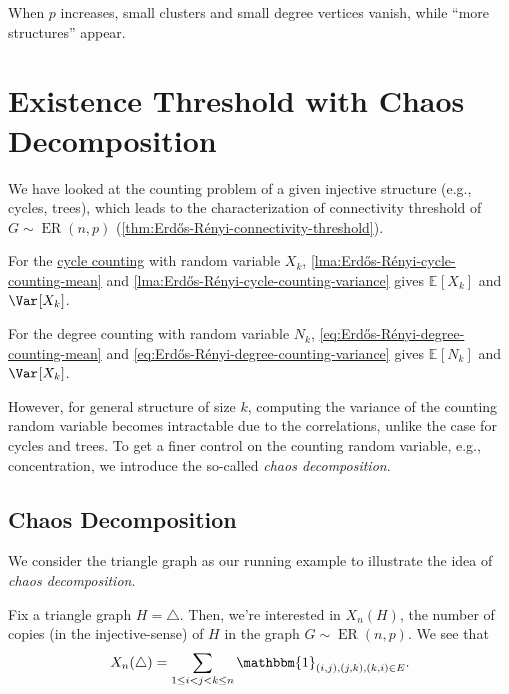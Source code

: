 \begin{note}
	When \(p\) increases, small clusters and small degree vertices vanish, while ``more structures'' appear.
\end{note}

\section{Existence Threshold with Chaos Decomposition}
We have looked at the counting problem of a given injective structure (e.g., cycles, trees), which leads to the characterization of connectivity threshold of \(G \sim \operatorname{ER}(n, p) \) (\autoref{thm:Erdős-Rényi-connectivity-threshold}).

\begin{prev}[Cycle]
	For the \hyperref[prb:cycle-counting]{cycle counting} with random variable \(X_k\), \autoref{lma:Erdős-Rényi-cycle-counting-mean} and \autoref{lma:Erdős-Rényi-cycle-counting-variance} gives \(\mathbb{E}_{}[X_k] \) and \(\Var_{}[X_k] \).
\end{prev}

\begin{prev}[Degree]
	For the degree counting with random variable \(N_k\), \autoref{eq:Erdős-Rényi-degree-counting-mean} and \autoref{eq:Erdős-Rényi-degree-counting-variance} gives \(\mathbb{E}_{}[N_k] \) and \(\Var_{}[X_k] \).
\end{prev}

However, for general structure of size \(k\), computing the variance of the counting random variable becomes intractable due to the correlations, unlike the case for cycles and trees. To get a finer control on the counting random variable, e.g., concentration, we introduce the so-called \emph{chaos decomposition}.

\subsection{Chaos Decomposition}
We consider the triangle graph as our running example to illustrate the idea of \emph{chaos decomposition}.

\begin{eg}
	Fix a triangle graph \(H = \triangle\). Then, we're interested in \(X_n(H)\), the number of copies (in the injective-sense) of \(H\) in the graph \(G \sim \operatorname{ER}(n, p) \). We see that
	\[
		X_n(\triangle )
		= \sum_{1 \leq i < j < k \leq n} \mathbbm{1}_{(i, j), (j, k), (k, i) \in E}.
	\]
\end{eg}

